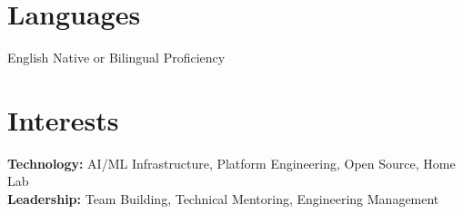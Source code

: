 \documentclass[11pt,a4paper]{article}
\begin{document}
\section{Languages}

{\normalsize English} \hfill {\scriptsize\color{textgray} Native or Bilingual Proficiency}

\section{Interests}

{\small\textbf{Technology:}} AI/ML Infrastructure, Platform Engineering, Open Source, Home Lab\\
{\small\textbf{Leadership:}} Team Building, Technical Mentoring, Engineering Management
\end{document}

